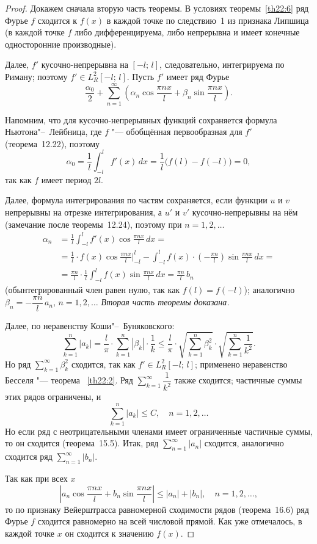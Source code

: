 \begin{proof}
Докажем сначала вторую часть теоремы. В условиях теоремы~\ref{th22:6} ряд Фурье $f$ сходится к $f(x)$ в каждой точке по следствию~1 из признака Липшица (в каждой точке $f$ либо дифференцируема, либо непрерывна и имеет конечные односторонние производные).

Далее, $f'$ кусочно-непрерывна на $[-l;\, l]$, следовательно, интегрируема по Риману; поэтому $f' \in L_R^2[-l;\, l]$. Пусть $f'$ имеет ряд Фурье
$$
\frac{\alpha_0}{2} + \sum_{n=1}^{\infty} \left(\alpha_n \cos\frac{\pi n x}{l} + \beta_n \sin\frac{\pi n x}{l}\right).
$$

Напомним, что для кусочно-непрерывных функций сохраняется формула Ньютона"--~Лейбница, где $f$ "--- обобщённая первообразная для $f'$ (теорема~12.22), поэтому
$$
\alpha_0 = \frac{1}{l} \int_{-l}^{l} f'(x)\,dx = \frac{1}{l}\bigl(f(l) - f(-l)\bigr) = 0,
$$
так как $f$ имеет период $2l$.

Далее, формула интегрирования по частям сохраняется, если функции $u$ и $v$ непрерывны на отрезке интегрирования, а $u'$ и $v'$ кусочно-непрерывны на нём (замечание после теоремы~12.24), поэтому при $n = 1, 2, \ldots$
\begin{align*}
\alpha_n &= \frac{1}{l} \int_{-l}^{l} f'(x) \cos\frac{\pi n x}{l}\,dx = \\
&= \frac{1}{l} \cdot f(x) \cos\frac{\pi n x}{l}\bigg|_{-l}^{l} - \int_{-l}^{l} f(x) \cdot \left(-\frac{\pi n}{l}\right) \sin\frac{\pi n x}{l}\,dx = \\
&= \frac{\pi n}{l} \cdot \frac{1}{l} \int_{-l}^{l} f(x) \sin\frac{\pi n x}{l}\,dx = \frac{\pi n}{l}\, b_n
\end{align*}
(обынтегрированный член равен нулю, так как $f(l) = f(-l)$); аналогично $\beta_n = -\dfrac{\pi n}{l}\, a_n$, $n = 1, 2, \ldots$ \textit{Вторая часть теоремы доказана.}

Далее, по неравенству Коши"--~Буняковского:
$$
\sum_{k=1}^{n} |a_k| = \frac{l}{\pi} \cdot \sum_{k=1}^{n} |\beta_k| \cdot \frac{1}{k} \le \frac{l}{\pi} \cdot \sqrt{\sum_{k=1}^{n} \beta_k^2} \cdot \sqrt{\sum_{k=1}^{n} \frac{1}{k^2}}.
$$
Но ряд $\sum_{k=1}^{\infty} \beta_k^2$ сходится, так как $f' \in L_R^2[-l;\, l]$; применено неравенство Бесселя "--- теорема ~\ref{th22:2}. Ряд $\sum_{k=1}^{\infty} \dfrac{1}{k^2}$ также сходится; частичные суммы этих рядов ограничены, и
$$
\sum_{k=1}^{n} |a_k| \le C, \quad n = 1, 2, \ldots
$$
Но если ряд с неотрицательными членами имеет ограниченные частичные суммы, то он сходится (теорема~15.5). Итак, ряд $\sum_{n=1}^{\infty} |a_n|$ сходится, аналогично сходится ряд $\sum_{n=1}^{\infty} |b_n|$.

Так как при всех $x$
$$
\left|a_n \cos\frac{\pi n x}{l} + b_n \sin\frac{\pi n x}{l}\right| \le |a_n| + |b_n|, \quad n = 1, 2, \ldots,
$$
то по признаку Вейерштрасса равномерной сходимости рядов (теорема~16.6) ряд Фурье $f$ сходится равномерно на всей числовой прямой. Как уже отмечалось, в каждой точке $x$ он сходится к значению $f(x)$.
\end{proof}

